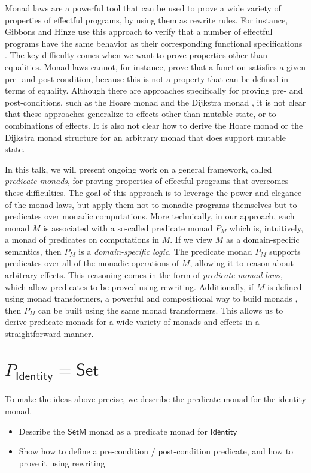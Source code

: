 \documentclass[preprint]{sigplanconf}
\begin{document}
Monad laws are a powerful tool that can be used to prove a wide variety of
properties of effectful programs, by using them as rewrite rules. For instance,
Gibbons and Hinze use this approach to verify that a number of effectful
programs have the same behavior as their corresponding functional specifications
\cite{gibbons11}.
%
The key difficulty comes when we want to prove properties other than equalities.
Monad laws cannot, for instance, prove that a function satisfies a given pre-
and post-condition, because this is not a property that can be defined in terms
of equality. Although there are approaches specifically for proving pre- and
post-conditions, such as the Hoare monad \cite{nanevski08} and the Dijkstra
monad \cite{swamy13}, it is not clear that these approaches generalize to
effects other than mutable state, or to combinations of effects.
It is also not clear how to derive the Hoare monad or the Dijkstra monad
structure for an arbitrary monad that does support mutable state.


In this talk, we will present ongoing work on a general framework, called
\emph{predicate monads}, for proving properties of effectful programs that
overcomes these difficulties. The goal of this approach is to leverage the power
and elegance of the monad laws, but apply them not to monadic programs
themselves but to predicates over monadic computations.  More technically, in
our approach, each monad $M$ is associated with a so-called predicate monad $P_M$
which is, intuitively, a monad of predicates on computations in $M$.
If we view $M$ as a domain-specific semantics, then $P_M$ is a
\emph{domain-specific logic}.
The predicate monad $P_M$ supports predicates over all of the monadic operations
of $M$, allowing it to reason about arbitrary effects. This reasoning comes in
the form of \emph{predicate monad laws}, which allow predicates to be proved
using rewriting. Additionally, if $M$ is defined using monad transformers, a
powerful and compositional way to build monads \cite{liang95}, then $P_M$ can be
built using the same monad transformers. This allows us to derive predicate
monads for a wide variety of monads and effects in a straightforward manner.

\section{$P_{\mathsf{Identity}} = \mathsf{Set}$}
To make the ideas above precise, we describe the predicate monad for the identity monad.


\begin{itemize}
\item Describe the $\mathsf{SetM}$ monad as a predicate monad for
  $\mathsf{Identity}$
\item Show how to define a pre-condition / post-condition predicate, and
  how to prove it using rewriting
\end{itemize}




\end{document}

